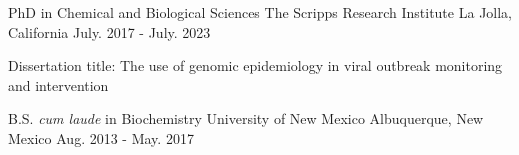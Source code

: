 
\begin{cventries}

  \cventry
    {PhD in Chemical and Biological Sciences} %
    {The Scripps Research Institute} %
    {La Jolla, California} %
    {July. 2017 - July. 2023} %
    {
      \begin{cvitems} %
        \item {Dissertation title: The use of genomic epidemiology in viral outbreak monitoring and intervention}
      \end{cvitems}
    }

  \cventry
    {B.S. \textit{cum laude} in Biochemistry} %
    {University of New Mexico} %
    {Albuquerque, New Mexico} %
    {Aug. 2013 - May. 2017} %
    {}

\end{cventries}
